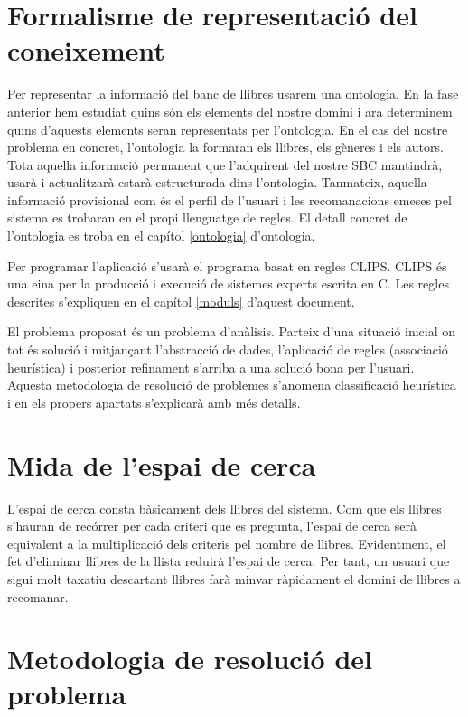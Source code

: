 
\section{Formalisme de representació del coneixement}

Per representar la informació del banc de llibres usarem una ontologia. En la fase anterior hem estudiat quins són els elements del nostre domini i ara determinem quins d'aquests elements seran representats per l'ontologia. En el cas del nostre problema en concret, l'ontologia la formaran els llibres, els gèneres i els autors. Tota aquella informació permanent que l'adquirent del nostre SBC mantindrà, usarà i actualitzarà estarà estructurada dins l'ontologia. Tanmateix, aquella informació provisional com és el perfil de l'usuari i les recomanacions emeses pel sistema es trobaran en el propi llenguatge de regles. El detall concret de l'ontologia es troba en el capítol \ref{ontologia} d'ontologia.

Per programar l'aplicació s'usarà el programa basat en regles CLIPS. CLIPS és una eina per la producció i execució de sistemes experts escrita en C. Les regles descrites s'expliquen en el capítol \ref{moduls} d'aquest document.

El problema proposat és un problema d'anàlisis. Parteix d'una situació inicial on tot és solució i mitjançant l'abstracció de dades, l'aplicació de regles (associació heurística) i posterior refinament s'arriba a una solució bona per l'usuari. Aquesta metodologia de resolució de problemes s'anomena classificació heurística i en els propers apartats s'explicarà amb més detalls.

\section{Mida de l'espai de cerca }

L'espai de cerca consta bàsicament dels llibres del sistema. Com que els llibres s'hauran de recórrer per cada criteri que es pregunta, l'espai de cerca serà equivalent a la multiplicació dels criteris pel nombre de llibres. Evidentment, el fet d'eliminar llibres de la llista reduirà l'espai de cerca. Per tant, un usuari que sigui molt taxatiu descartant llibres farà minvar ràpidament el domini de llibres a recomanar.

\section{Metodologia de resolució del problema}

